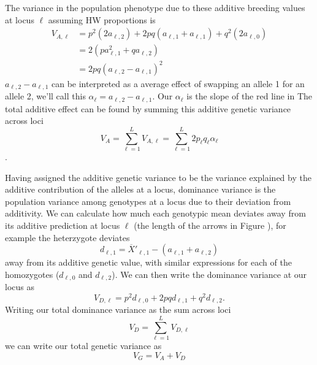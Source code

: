 The variance in the population phenotype due to these
additive breeding values at locus $\ell$ assuming HW proportions is
\begin{align}
V_{A, \ell} &= p^2 (2a_{\ell,2}) + 2pq (a_{\ell,1}+a_{\ell,1}) + q^2
(2a_{\ell,0}) \\
& = 2(p a_{\ell, 1} ^2 + q a_{\ell, 2} )\\
& = 2pq (a_{\ell, 2}-a_{\ell, 1})^2
\end{align}
$a_{\ell, 2}-a_{\ell, 1}$ can be interpreted as a average effect of
swapping an allele 1 for an allele 2, we'll call this
$\alpha_{\ell}=a_{\ell, 2}-a_{\ell, 1}$. Our $\alpha_{\ell}$ is the
slope of the red line in 
The total additive effect can
be found by summing this additive genetic variance across loci
\begin{equation}
V_A = \sum_{\ell=1}^{L} V_{A, \ell} = \sum_{\ell=1}^{L}
2p_{\ell}q_{\ell} \alpha_{\ell}
\end{equation}. 

Having assigned the additive genetic variance to be the variance
explained by the additive contribution of the alleles at a locus,  dominance variance is the population variance among
genotypes at a locus due to their deviation from additivity.
We can calculate how much each genotypic mean deviates away from its
additive prediction at locus $\ell$ (the length of the arrows in
Figure \label{fig:add_dom}), for example the heterzygote deviates 
\begin{equation}
d_{\ell,1} =\overline{X}'_{\ell,1}  - (a_{\ell,1}+ a_{\ell,2})
\end{equation}
away from its additive genetic value, with similar expressions for
each of the homozygotes ($d_{\ell,0}$ and $d_{\ell,2}$). We can then write the dominance variance at
our locus as 
\begin{equation}
V_{D,\ell} = p^2 d_{\ell,0}+ 2pq d_{\ell,1}+ q^2 d_{\ell,2}.
\end{equation}
Writing our total dominance variance as the sum across loci 
\begin{equation}
V_D = \sum_{\ell=1}^{L}  V_{D,\ell} 
\end{equation}
we can write our total genetic variance as 
\begin{equation}
V_{G} = V_A+V_D
\end{equation}

\newpage
